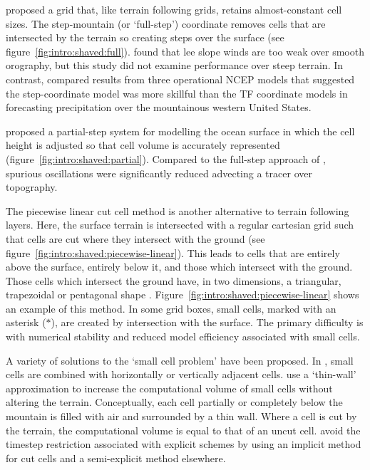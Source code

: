 \textcite{mesinger1988} proposed a grid that, like terrain following grids, retains almost-constant cell sizes.  The step-mountain (or `full-step') coordinate removes cells that are intersected by the terrain so creating steps over the surface (see figure~\ref{fig:intro:shaved:full}).  \textcite{gallus-klemp2000} found that lee slope winds are too weak over smooth orography, but this study did not examine performance over steep terrain.  In contrast, \textcite{mesinger2004} compared results from three operational NCEP models that suggested the step-coordinate model was more skillful than the TF coordinate models in forecasting precipitation over the mountainous western United States.

\textcite{adcroft1997} proposed a partial-step system for modelling the ocean surface in which the cell height is adjusted so that cell volume is accurately represented (figure~\ref{fig:intro:shaved:partial}).  Compared to the full-step approach of \textcite{mesinger1988}, spurious oscillations were significantly reduced advecting a tracer over topography.

The piecewise linear cut cell method is another alternative to terrain following layers.  Here, the surface terrain is intersected with a regular cartesian grid such that cells are cut where they intersect with the ground (see figure~\ref{fig:intro:shaved:piecewise-linear}).  
This leads to cells that are entirely above the surface, entirely below it, and those which intersect with the ground.  Those cells which intersect the ground have, in two dimensions, a triangular, trapezoidal or pentagonal shape \autocite{rosatti2005}.  Figure~\ref{fig:intro:shaved:piecewise-linear} shows an example of this method.  In some grid boxes, small cells, marked with an asterisk ($\ast$), are created by intersection with the surface.
The primary difficulty is with numerical stability and reduced model efficiency associated with small cells. 

A variety of solutions to the `small cell problem' have been proposed.  In \textcite{yamazaki-satomura2010}, small cells are combined with horizontally or vertically adjacent cells.  \textcite{steppeler2002} use a `thin-wall' approximation to increase the computational volume of small cells without altering the terrain.  Conceptually, each cell partially or completely below the mountain is filled with air and surrounded by a thin wall.  Where a cell is cut by the terrain, the computational volume is equal to that of an uncut cell.  \textcite{jebens2011} avoid the timestep restriction associated with explicit schemes by using an implicit method for cut cells and a semi-explicit method elsewhere.


